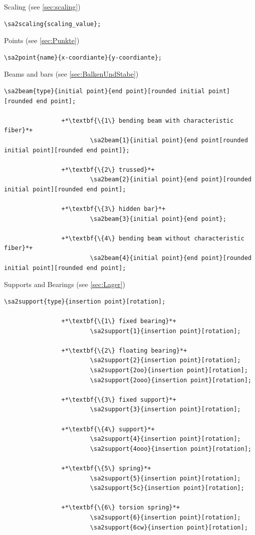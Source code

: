 \documentclass[%
  a4paper,
  BCOR=20mm,
  numbers=noenddot,
  twoside,
  parskip=half,
  openright,
  version=last,
]{scrreprt}
\begin{document}
Scaling (see \ref{sec:scaling})

\begin{lstlisting}[emph={scaling},backgroundcolor=\color{white}]
		\sa2scaling{scaling_value};
\end{lstlisting}\vspace{-10mm}

Points (see \ref{sec:Punkte})

\begin{lstlisting}[emph={point},backgroundcolor=\color{white}]
		\sa2point{name}{x-coordiante}{y-coordiante};
\end{lstlisting}\vspace{-10mm}

Beams and bars (see \ref{sec:BalkenUndStabe})

\begin{lstlisting}[emph={beam},backgroundcolor=\color{white}]
		\sa2beam{type}{initial point}{end point}[rounded initial point][rounded end point];
		
				+*\textbf{\{1\} bending beam with characteristic fiber}*+
						\sa2beam{1}{initial point}{end point[rounded initial point][rounded end point]};
						
				+*\textbf{\{2\} trussed}*+
						\sa2beam{2}{initial point}{end point}[rounded initial point][rounded end point];
						
				+*\textbf{\{3\} hidden bar}*+
						\sa2beam{3}{initial point}{end point};
						
				+*\textbf{\{4\} bending beam without characteristic fiber}*+
						\sa2beam{4}{initial point}{end point}[rounded initial point][rounded end point];										
\end{lstlisting}\vspace{-10mm}

Supports and Bearings (see \ref{sec:Lager})

\begin{lstlisting}[emph={support},backgroundcolor=\color{white}]
		\sa2support{type}{insertion point}[rotation];
		
				+*\textbf{\{1\} fixed bearing}*+
						\sa2support{1}{insertion point}[rotation];
						
				+*\textbf{\{2\} floating bearing}*+
						\sa2support{2}{insertion point}[rotation];
						\sa2support{2oo}{insertion point}[rotation];
						\sa2support{2ooo}{insertion point}[rotation];
						
				+*\textbf{\{3\} fixed support}*+
						\sa2support{3}{insertion point}[rotation];
						
				+*\textbf{\{4\} support}*+
						\sa2support{4}{insertion point}[rotation];	
						\sa2support{4ooo}{insertion point}[rotation];

				+*\textbf{\{5\} spring}*+
						\sa2support{5}{insertion point}[rotation];	
						\sa2support{5c}{insertion point}[rotation];

				+*\textbf{\{6\} torsion spring}*+
						\sa2support{6}{insertion point}[rotation];	
						\sa2support{6cw}{insertion point}[rotation];
\end{lstlisting}\vspace{-10mm}
\end{document}
